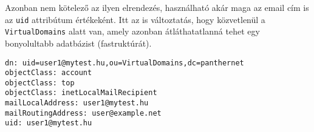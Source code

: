 Azonban nem kötelező az ilyen elrendezés, használható akár maga az email cím is az \texttt{uid} attribútum
értékeként. Itt az is változtatás, hogy közvetlenül a \texttt{VirtualDomains} alatt van, amely azonban átláthatatlanná
tehet egy bonyolultabb adatbázist (fastruktúrát).

\begin{Verbatim}[frame=single,label=user1@mytest.hu]
dn: uid=user1@mytest.hu,ou=VirtualDomains,dc=panthernet
objectClass: account
objectClass: top
objectClass: inetLocalMailRecipient
mailLocalAddress: user1@mytest.hu
mailRoutingAddress: user@example.net
uid: user1@mytest.hu
\end{Verbatim}


